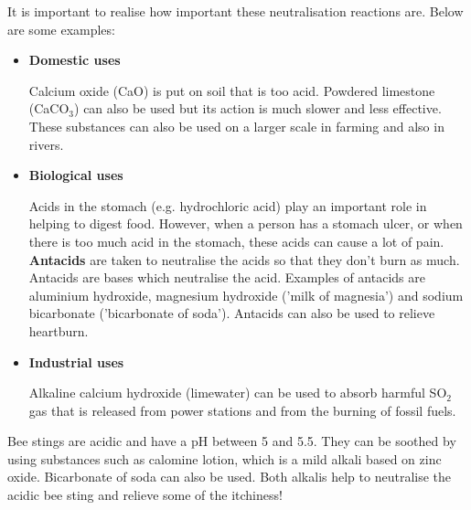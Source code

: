It is important to realise how important these neutralisation reactions are. Below are some examples:

\begin{itemize}
\item{\textbf{Domestic uses}

Calcium oxide (CaO) is put on soil that is too acid. Powdered limestone (CaCO$_{3}$) can also be used but its action is much slower and less effective. These substances can also be used on a larger scale in farming and also in rivers. }

\item{\textbf{Biological uses}

Acids in the stomach (e.g. hydrochloric acid) play an important role in helping to digest food. However, when a person has a stomach ulcer, or when there is too much acid in the stomach, these acids can cause a lot of pain. \textbf{Antacids} are taken to neutralise the acids so that they don't burn as much. Antacids are bases which neutralise the acid. Examples of antacids are aluminium hydroxide, magnesium hydroxide ('milk of magnesia') and sodium bicarbonate ('bicarbonate of soda'). Antacids can also be used to relieve heartburn.}

\item{\textbf{Industrial uses}

Alkaline calcium hydroxide (limewater) can be used to absorb harmful SO$_{2}$ gas that is released from power stations and from the burning of fossil fuels. 
}


\end{itemize}

\begin{IFact}{
Bee stings are acidic and have a pH between 5 and 5.5. They can be soothed by using substances such as calomine lotion, which is a mild alkali based on zinc oxide. Bicarbonate of soda can also be used. Both alkalis help to neutralise the acidic bee sting and relieve some of the itchiness! 
}
\end{IFact}

